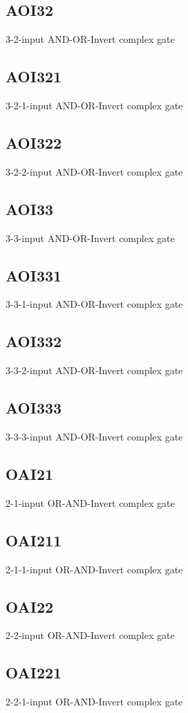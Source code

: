 \documentclass[12pt, a4paper, twoside, titlepage]{article}
\begin{document}
\subsection{AOI32}
3-2-input AND-OR-Invert complex gate

\subsection{AOI321}
3-2-1-input AND-OR-Invert complex gate

\subsection{AOI322}
3-2-2-input AND-OR-Invert complex gate

\subsection{AOI33}
3-3-input AND-OR-Invert complex gate

\subsection{AOI331}
3-3-1-input AND-OR-Invert complex gate

\subsection{AOI332}
3-3-2-input AND-OR-Invert complex gate

\subsection{AOI333}
3-3-3-input AND-OR-Invert complex gate

\subsection{OAI21}
2-1-input OR-AND-Invert complex gate

\subsection{OAI211}
2-1-1-input OR-AND-Invert complex gate

\subsection{OAI22}
2-2-input OR-AND-Invert complex gate

\subsection{OAI221}
2-2-1-input OR-AND-Invert complex gate
\end{document}
